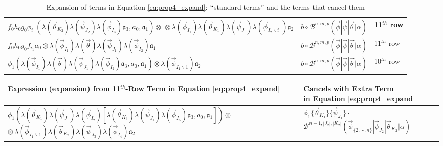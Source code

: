 \begin{landscape}
\begin{center}
\begin{table}
\begin{tabular}{ p{3.8in} | p{1.5in} | p{2.2in} }
    \breakcell{$f_0h_0g_0 \phi_{i_1} ( \lambda(\vec{\theta}_{K_2}) \lambda(\vec{\psi}_{J_2}) \lambda(\vec{\phi}_{I_3})
       \mathfrak{a}_3, a_0, \mathfrak{a}_1) \otimes$\\
       $\otimes \, 
       \lambda(\vec{\phi}_{I_1}) \lambda(\vec{\theta}_{K_1}) \lambda(\vec{\psi}_{J_1}) 
       \lambda(\vec{\phi}_{I_2 \backslash i_1}) \mathfrak{a}_2$} &
    $b \circ \mathcal{B}^{n,m,p} (\vec{\phi} | \vec{\psi} | \vec{\theta} | \alpha)$ & 
    11$^{th}$ row \\ \hline

    $f_0h_0g_0f_{i_1}a_0 \otimes \lambda(\vec{\phi}_{I_1}) \lambda(\vec{\theta}) 
       \lambda(\vec{\psi}_{J_1}) \lambda(\vec{\phi}_{I_2}) \mathfrak{a}_1$ &
    $b \circ \mathcal{B}^{n,m,p} (\vec{\phi} | \vec{\psi} | \vec{\theta} | \alpha)$ & 
    11$^{th}$ row \\ \hline

    $\phi_1( \lambda(\vec{\phi}_{I_1}) \lambda(\vec{\theta}) 
       \lambda(\vec{\psi}_{J_1}) \lambda(\vec{\phi}_{I_2}) \mathfrak{a}_3, a_0, \mathfrak{a}_1 ) \otimes
       \lambda(\vec{\phi}_{I_1 \backslash 1}) \mathfrak{a}_2$ &
    $b \circ \mathcal{B}^{n,m,p} (\vec{\phi} | \vec{\psi} | \vec{\theta} | \alpha)$ & 
    10$^{th}$ row \\ \hline

  \end{tabular}
\caption{Expansion of terms in Equation \ref{eq:prop4_expand}: 
$``$standard terms'' and the 
terms that cancel them}
\label{table:t41}
\end{table}  
\end{center}
%
%
\begin{center}
\begin{table}
  \begin{tabular}{ p{5.3in} | p{2.2in} }
    \hline
    Expression (expansion) from 11$^{th}$-Row Term in Equation \ref{eq:prop4_expand} & 
    \breakcell{Cancels with Extra Term\\in Equation \ref{eq:prop4_expand}} \\ \hline
    \breakcell{$\phi_1(\lambda(\vec{\theta}_{K_1}) \lambda(\vec{\psi}_{J_1}) \lambda(\vec{\phi}_{I_2}) [
      \lambda(\vec{\theta}_{K_3}) \lambda(\vec{\psi}_{J_4}) \lambda(\vec{\phi}_{I_5})
      \mathfrak{a}_3, a_0, \mathfrak{a}_1]) \otimes$\\
      $\otimes\, \lambda(\vec{\phi}_{I_1\backslash 1}) \lambda(\vec{\theta}_{K_2}) 
      \lambda(\vec{\psi}_{J_3}) \lambda(\vec{\phi}_{I_4}) \mathfrak{a}_2$} &
    \breakcell{$\phi_1 \{\vec{\theta}_{K_1}\} \{\vec{\psi}_{J_1}\} \cdot$\\
     $\mathcal{B}^{n-1, |J_2|, |K_2|}
     (\vec{\phi}_{\{2,\cdots,n\}} | \vec{\psi}_{J_2} | \vec{\theta}_{K_2} | \alpha)$} \\ \hline


\end{tabular}
\end{table}
\end{center}
\end{landscape}
